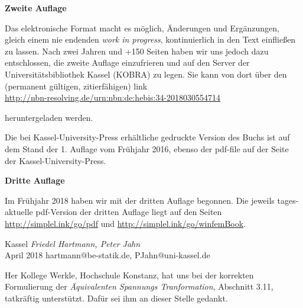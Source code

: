 
\begin{flushleft}\large{\bf{Zweite Auflage}} \end{flushleft}

Das elektronische Format macht es m\"{o}glich, \"{A}nderungen und Erg\"{a}nzungen, gleich einem nie endenden {\em work in progress\/}, kontinuierlich in den Text einflie{\ss}en zu lassen. Nach zwei Jahren und +150 Seiten haben wir uns jedoch dazu entschlossen, die zweite Auflage \glq einzufrieren\grq{} und auf den Server der Universit\"{a}tsbibliothek Kassel (KOBRA) zu legen. Sie kann von dort \"{u}ber den (permanent g\"{u}ltigen, \glq zitierf\"{a}higen\grq{}) link\\

\href{http://nbn-resolving.de/urn:nbn:de:hebis:34-2018030554714}{http://nbn-resolving.de/urn:nbn:de:hebis:34-2018030554714}

\begin{flushleft} heruntergeladen werden. \end{flushleft}
Die bei Kassel-University-Press erh\"{a}ltliche gedruckte Version des Buchs ist auf dem Stand der 1. Auflage vom Fr\"{u}hjahr 2016, ebenso der pdf-file auf der Seite der Kassel-University-Press.


\begin{flushleft}\large{\bf{Dritte Auflage}} \end{flushleft}

Im Fr\"{u}hjahr 2018 haben wir mit der dritten Auflage begonnen. Die jeweils tages-aktuelle pdf-Version der dritten Auflage liegt auf den Seiten\\

 \href{http://simplel.ink/go/pdf}{http://simplel.ink/go/pdf} und \href{http://simplel.ink/go/winfemBook}{http://simplel.ink/go/winfemBook}.

\begin{flushright}\noindent
Kassel  {\hfill {\it Friedel Hartmann, Peter Jahn}}\\\vspace{0.1cm}
April 2018   {\hfill {hartmann@be-statik.de, PJahn@uni-kassel.de}}\\
\end{flushright}

\vspace{1 cm}
\begin{acknowledgement}
Her Kollege Werkle, Hochschule Konstanz, hat uns bei der korrekten Formulierung der {\em \"{A}quivalenten Spannungs Tranformation\/}, Abschnitt 3.11, tatkr\"{a}ftig unterst\"{u}tzt. Daf\"{u}r sei ihm an dieser Stelle gedankt.\\
\end{acknowledgement}

